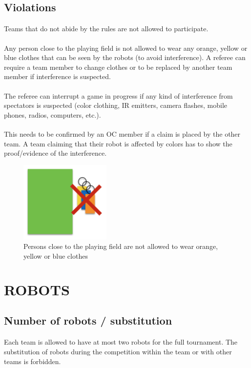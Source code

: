 \documentclass{article}
\newcommand*{\p}{\paragraph{}}
\begin{document}
\subsection{Violations \label{ref-violations}}

\p Teams that do not abide by the rules are not allowed to participate.

\p Any person close to the playing field is not allowed to wear any orange, yellow
or blue clothes that can be seen by the robots (to avoid interference). A
referee can require a team member to change clothes or to be replaced by
another team member if interference is suspected.

\p The referee can interrupt a game in progress if any kind of interference from
spectators is suspected (color clothing, IR emitters, camera flashes, mobile
phones, radios, computers, etc.).

\p This needs to be confirmed by an OC member if a claim is placed by the other
team.  A team claiming that their robot is affected by colors has to show the
proof/evidence of the interference.

\begin{figure}[H]
    \centering
    \includegraphics[width=0.4\textwidth]{media/image2.png}
    \caption{Persons close to the playing field are not allowed to wear orange,
        yellow or blue clothes}
    \label{fig:spectators}
\end{figure}


\section{ROBOTS\label{ref-018}}

\subsection{ Number of robots / substitution \label{ref-number-of-robots}}

\p Each team is allowed to have at most two robots for the full tournament. The
substitution of robots during the competition within the team or with other
teams is forbidden.
\end{document}
